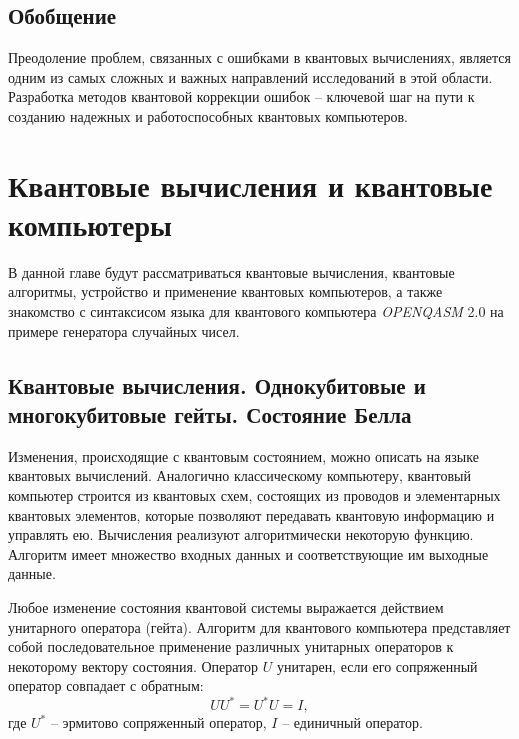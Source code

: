 \documentclass[12pt,a4paper]{article}
\begin{document}
	\subsection{Обобщение}
	
	Преодоление проблем, связанных с ошибками в квантовых вычислениях, является одним из самых сложных и важных направлений исследований в этой области. Разработка методов квантовой коррекции ошибок – ключевой шаг на пути к созданию надежных и работоспособных квантовых компьютеров.
	\section{Квантовые вычисления и квантовые компьютеры}
	
	В данной главе будут рассматриваться квантовые вычисления, квантовые алгоритмы, устройство и применение квантовых компьютеров, а также знакомство с синтаксисом языка для квантового компьютера \textit{OPENQASM} 2.0 на примере генератора случайных чисел. 
	\subsection{Квантовые вычисления. Однокубитовые и многокубитовые гейты. Состояние Белла}
	
	Изменения, происходящие с квантовым состоянием, можно описать на языке квантовых вычислений. Аналогично классическому компьютеру, квантовый компьютер строится из квантовых схем, состоящих из проводов и элементарных квантовых элементов, которые позволяют передавать квантовую информацию и управлять ею. Вычисления реализуют алгоритмически некоторую функцию. Алгоритм имеет множество входных данных и соответствующие им выходные данные.
	
	Любое изменение состояния квантовой системы выражается действием унитарного оператора (гейта). Алгоритм для квантового компьютера представляет собой последовательное применение различных унитарных операторов к некоторому вектору состояния. Оператор $U$ унитарен, если его сопряженный оператор совпадает с обратным:
	\begin{equation}
		UU^{*} = U^{*}U = I,
	\end{equation}
	где $U^{*}$ -- эрмитово сопряженный оператор, $I$ -- единичный оператор. 
	
\end{document}
